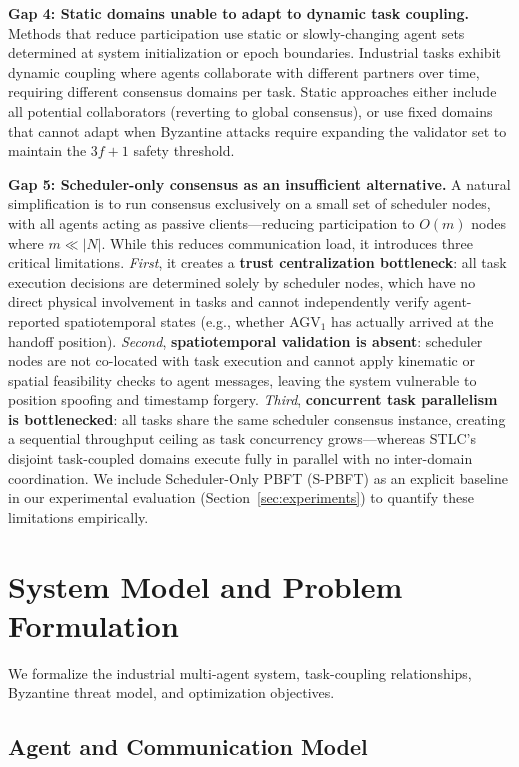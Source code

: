 \documentclass[manuscript,screen,review]{acmart}
\begin{document}
\textbf{Gap 4: Static domains unable to adapt to dynamic task coupling.} Methods that reduce participation use static or slowly-changing agent sets determined at system initialization or epoch boundaries. Industrial tasks exhibit dynamic coupling where agents collaborate with different partners over time, requiring different consensus domains per task. Static approaches either include all potential collaborators (reverting to global consensus), or use fixed domains that cannot adapt when Byzantine attacks require expanding the validator set to maintain the $3f+1$ safety threshold.

\textbf{Gap 5: Scheduler-only consensus as an insufficient alternative.} A natural simplification is to run consensus exclusively on a small set of scheduler nodes, with all agents acting as passive clients---reducing participation to $O(m)$ nodes where $m \ll |N|$. While this reduces communication load, it introduces three critical limitations. \textit{First}, it creates a \textbf{trust centralization bottleneck}: all task execution decisions are determined solely by scheduler nodes, which have no direct physical involvement in tasks and cannot independently verify agent-reported spatiotemporal states (e.g., whether AGV$_1$ has actually arrived at the handoff position). \textit{Second}, \textbf{spatiotemporal validation is absent}: scheduler nodes are not co-located with task execution and cannot apply kinematic or spatial feasibility checks to agent messages, leaving the system vulnerable to position spoofing and timestamp forgery. \textit{Third}, \textbf{concurrent task parallelism is bottlenecked}: all tasks share the same scheduler consensus instance, creating a sequential throughput ceiling as task concurrency grows---whereas STLC's disjoint task-coupled domains execute fully in parallel with no inter-domain coordination. We include Scheduler-Only PBFT (S-PBFT) as an explicit baseline in our experimental evaluation (Section~\ref{sec:experiments}) to quantify these limitations empirically.

\section{System Model and Problem Formulation}
\label{sec:model}

We formalize the industrial multi-agent system, task-coupling relationships, Byzantine threat model, and optimization objectives.

\subsection{Agent and Communication Model}
\label{sec:agent_com_model}
\end{document}
